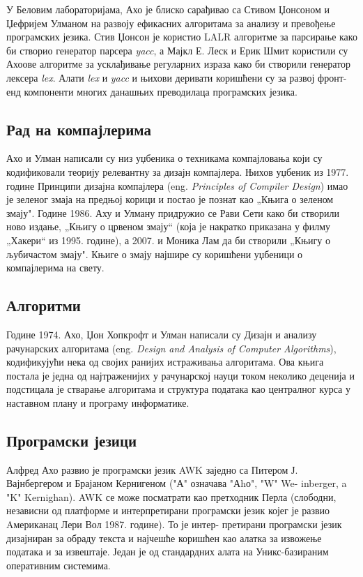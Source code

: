 \documentclass[a4paper]{article}
\begin{document}
У Беловим лабораторијама, Ахо је блиско сарађивао са Стивом Џонсоном и Џефријем Улманом на развоју ефикасних алгоритама за анализу и превођење програмских језика. Стив Џонсон је користио LALR алгоритме за парсирање како би створио генератор парсера \emph{yacc}, а Мајкл Е. Леск и Ерик Шмит користили су Ахоове алгоритме за усклађивање регуларних израза како би створили генератор лексера \emph{lex}. Алати \emph{lex} и \emph{yacc} и њихови деривати коришћени су за развој фронт-енд компоненти многих данашњих преводилаца програмских језика. 

\subsection{Рад на компајлерима}
\label{subsec:podnaslov3}
Ахо и Улман написали су низ уџбеника о техникама компајловања који су кодификовали теорију релевантну за дизајн компајлера. Њихов уџбеник из 1977. године Принципи дизајна компајлера (eng. \emph{Principles of Compiler Design}) имао је зеленог змаја на предњој корици и постао је познат као „Књига о зеленом змају". Године 1986. Аху и Улману придружио се Рави Сети како би створили ново издање, „Књигу о црвеном змају“ (која је накратко приказана у филму „Хакери“ из 1995. године), а 2007. и Моника Лам да би створили „Књигу о љубичастом змају". Књиге о змају најшире су коришћени уџбеници о компајлерима на свету. 

\subsection{Алгоритми}
\label{subsec:podnaslov4}
Године 1974. Ахо, Џон Хопкрофт и Улман написали су Дизајн и анализу рачунарских алгоритама (eng. \emph{Design and Analysis of Computer Algorithms}), кодификујући нека од својих ранијих истраживања алгоритама. Ова књига постала је једна од најтраженијих у рачунарској науци током неколико деценија и подстицала је стварање алгоритама и структура података као централног курса у наставном плану и програму информатике.


\subsection{Програмски језици}
\label{subsec:podnaslov5}
Алфред Ахо развио је програмски језик AWK заједно са Питером Ј. Вајнбергером и Брајаном Кернигеном ("А" означава "Аhо", "W" We-
inberger, a "K" Kernighan). AWK се може посматрати као претходник Перла (слободни, независни од платформе и интерпретирани програмски језик којег је развио Aмериканац Лери Вол 1987. године). То је интер-
претирани програмски језик дизајниран за обраду текста и најчешће коришћен као алатка за извожење података и за извештаје. Један је од стандардних алата на Уникс-базираним оперативним системима.\cite{11}
\end{document}
